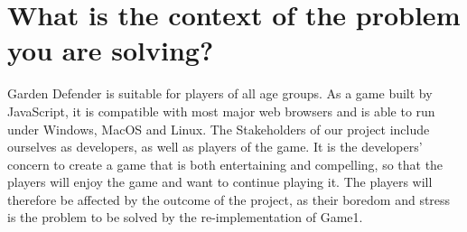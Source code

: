 \documentclass[12pt]{article}
\begin{document}
\section{What is the context of the problem you are solving?}

Garden Defender is suitable for players of all age groups. As a game built by JavaScript, it is compatible with most major web browsers and is able to run under Windows, MacOS and Linux. The Stakeholders of our project include ourselves as developers, as well as players of the game. It is the developers' concern to create a game that is both entertaining and compelling, so that the players will enjoy the game and want to continue playing it. The players will therefore be affected by the outcome of the project, as their boredom and stress is the problem to be solved by the re-implementation of Game1. 








\end{document}
